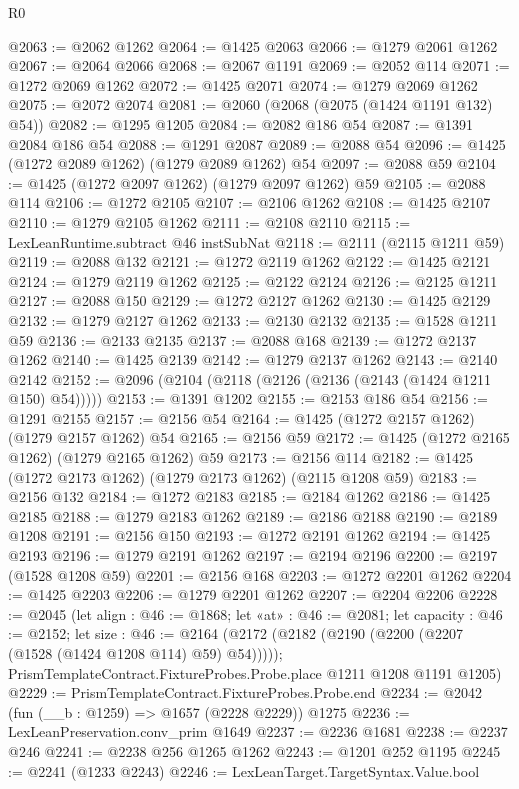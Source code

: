 \begin{lexlean}{R0}
\begin{coremodule}
@2063 := @2062 @1262
@2064 := @1425 @2063
@2066 := @1279 @2061 @1262
@2067 := @2064 @2066
@2068 := @2067 @1191
@2069 := @2052 @114
@2071 := @1272 @2069 @1262
@2072 := @1425 @2071
@2074 := @1279 @2069 @1262
@2075 := @2072 @2074
@2081 := @2060 (@2068 (@2075 (@1424 @1191 @132) @54))
@2082 := @1295 @1205
@2084 := @2082 @186 @54
@2087 := @1391 @2084 @186 @54
@2088 := @1291 @2087
@2089 := @2088 @54
@2096 := @1425 (@1272 @2089 @1262) (@1279 @2089 @1262) @54
@2097 := @2088 @59
@2104 := @1425 (@1272 @2097 @1262) (@1279 @2097 @1262) @59
@2105 := @2088 @114
@2106 := @1272 @2105
@2107 := @2106 @1262
@2108 := @1425 @2107
@2110 := @1279 @2105 @1262
@2111 := @2108 @2110
@2115 := LexLeanRuntime.subtract @46 instSubNat
@2118 := @2111 (@2115 @1211 @59)
@2119 := @2088 @132
@2121 := @1272 @2119 @1262
@2122 := @1425 @2121
@2124 := @1279 @2119 @1262
@2125 := @2122 @2124
@2126 := @2125 @1211
@2127 := @2088 @150
@2129 := @1272 @2127 @1262
@2130 := @1425 @2129
@2132 := @1279 @2127 @1262
@2133 := @2130 @2132
@2135 := @1528 @1211 @59
@2136 := @2133 @2135
@2137 := @2088 @168
@2139 := @1272 @2137 @1262
@2140 := @1425 @2139
@2142 := @1279 @2137 @1262
@2143 := @2140 @2142
@2152 := @2096 (@2104 (@2118 (@2126 (@2136 (@2143 (@1424 @1211 @150) @54)))))
@2153 := @1391 @1202
@2155 := @2153 @186 @54
@2156 := @1291 @2155
@2157 := @2156 @54
@2164 := @1425 (@1272 @2157 @1262) (@1279 @2157 @1262) @54
@2165 := @2156 @59
@2172 := @1425 (@1272 @2165 @1262) (@1279 @2165 @1262) @59
@2173 := @2156 @114
@2182 := @1425 (@1272 @2173 @1262) (@1279 @2173 @1262) (@2115 @1208 @59)
@2183 := @2156 @132
@2184 := @1272 @2183
@2185 := @2184 @1262
@2186 := @1425 @2185
@2188 := @1279 @2183 @1262
@2189 := @2186 @2188
@2190 := @2189 @1208
@2191 := @2156 @150
@2193 := @1272 @2191 @1262
@2194 := @1425 @2193
@2196 := @1279 @2191 @1262
@2197 := @2194 @2196
@2200 := @2197 (@1528 @1208 @59)
@2201 := @2156 @168
@2203 := @1272 @2201 @1262
@2204 := @1425 @2203
@2206 := @1279 @2201 @1262
@2207 := @2204 @2206
@2228 := @2045
    (let align : @46 := @1868;
    let «at» : @46 := @2081;
    let capacity : @46 := @2152;
    let size : @46 := @2164
      (@2172 (@2182 (@2190 (@2200 (@2207 (@1528 (@1424 @1208 @114) @59) @54)))));
    PrismTemplateContract.FixtureProbes.Probe.place @1211 @1208 @1191 @1205)
@2229 := PrismTemplateContract.FixtureProbes.Probe.end
@2234 := @2042 (fun (__b : @1259) => @1657 (@2228 @2229)) @1275
@2236 := LexLeanPreservation.conv_prim @1649
@2237 := @2236 @1681
@2238 := @2237 @246
@2241 := @2238 @256 @1265 @1262
@2243 := @1201 @252 @1195
@2245 := @2241 (@1233 @2243)
@2246 := LexLeanTarget.TargetSyntax.Value.bool

\end{coremodule}
\end{lexlean}
